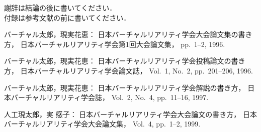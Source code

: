 \documentclass[a4paper]{jarticle}
\begin{document}
 謝辞は結論の後に書いてください．\\

 付録は参考文献の前に書いてください．



\begin{thebibliography}{9}

バーチャル太郎，現実花恵：
日本バーチャルリアリティ学会大会論文集の書き方，
日本バーチャルリアリティ学会第1回大会論文集，
pp.~1--2, 1996.

バーチャル太郎，現実花恵：
日本バーチャルリアリティ学会投稿論文の書き方，
日本バーチャルリアリティ学会論文誌，
Vol.~1, No.~2, pp.~201--206, 1996.

バーチャル太郎，現実花恵：
日本バーチャルリアリティ学会解説の書き方，
日本バーチャルリアリティ学会誌，
Vol.~2, No.~4, pp.~11--16, 1997.

人工現太郎，実 感子：
日本バーチャルリアリティ学会大会論文の書き方，
日本バーチャルリアリティ学会大会論文集，
Vol.~4, pp.~1--2, 1999.

\end{thebibliography}
\end{document}
